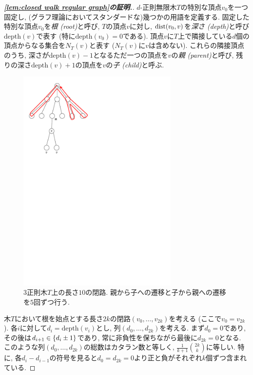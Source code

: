 \begin{proof}[\textbf{\cref{lem:closed walk regular graph}の証明.}]
    $d$-正則無限木$T$の特別な頂点$v_0$を一つ固定し, (グラフ理論においてスタンダードな)幾つかの用語を定義する.
    固定した特別な頂点$v_0$を\emph{根 (root)}と呼び,
    $T$の頂点$v$に対し, $\mathrm{dist}(v_0,v)$を\emph{深さ (depth)}と呼び$\mathrm{depth}(v)$で表す (特に$\mathrm{depth}(v_0)=0$である).
    頂点$v$に$T$上で隣接している$d$個の頂点からなる集合を$N_T(v)$と表す ($N_T(v)$に$v$は含めない).
    これらの隣接頂点のうち, 深さが$\mathrm{depth}(v)-1$となるただ一つの頂点を$v$の\emph{親 (parent)}と呼び,
    残りの深さ$\mathrm{depth}(v)+1$の頂点を$v$の\emph{子 (child)}と呼ぶ.

    \begin{figure}
        \begin{center}
            \includegraphics[width=8cm]{images/tree.pdf}
            \caption{$3$正則木$T$上の長さ$10$の閉路. 親から子への遷移と子から親への遷移を$5$回ずつ行う.}
        \end{center}
    \end{figure}

    木$T$において根を始点とする長さ$2k$の閉路$(v_0,\dots,v_{2k})$を考える (ここで$v_0=v_{2k}$).
    各$i$に対して$d_i = \mathrm{depth}(v_i)$とし, 列$(d_0,\dots,d_{2k})$を考える.
    まず$d_0=0$であり, その後は$d_{i+1} \in \lbrace d_i \pm 1\rbrace$であり, 常に非負性を保ちながら最後に$d_{2k}=0$となる.
    このような列$(d_0,\dots,d_{2k})$の総数はカタラン数と等しく, $\frac{1}{k+1}\binom{2k}{k}$に等しい.
    特に, 各$d_i - d_{i-1}$の符号を見ると$d_0 = d_{2k} = 0$より正と負がそれぞれ$k$個ずつ含まれている.


\end{proof}
